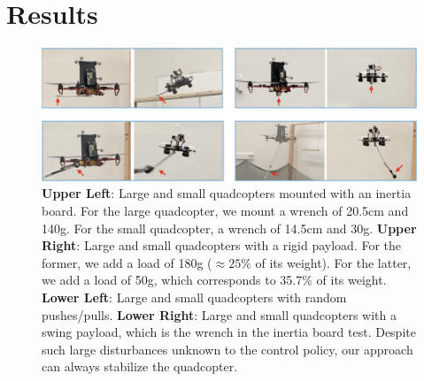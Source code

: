 \section{Results}





\begin{figure}[t]
    \centering
    \includegraphics[width=\linewidth]{img/disturbance-include-held-out.png}
    \caption{\small \textbf{Upper Left}: Large and small quadcopters mounted with an inertia board. For the large quadcopter, we mount a wrench of 20.5cm and 140g. For the small quadcopter, a wrench of 14.5cm and 30g. \textbf{Upper Right}: Large and small quadcopters with a rigid payload. For the former, we add a load of 180g ($\approx 25\%$ of its weight). For the latter, we add a load of 50g, which corresponds to 35.7\% of its weight. \textbf{Lower Left}: Large and small quadcopters with random pushes/pulls. \textbf{Lower Right}: Large and small quadcopters with a swing payload, which is the wrench in the inertia board test. Despite such large disturbances unknown to the control policy, our approach can always stabilize the quadcopter.}
    \vspace{-3ex}
    \label{fig:distur}
\end{figure}

